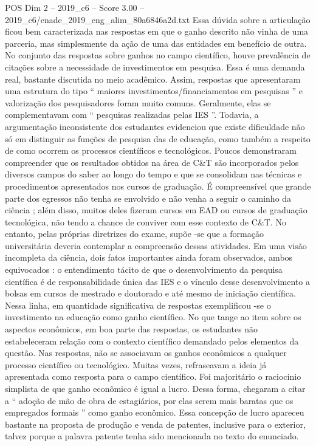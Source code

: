 \begin{textsample}{POS Dim 2 – 2019\_c6 – Score 3.00 – 2019\_c6/enade\_2019\_eng\_alim\_80a6846a2d.txt}
Essa dúvida sobre a articulação ficou bem caracterizada nas respostas em que o ganho descrito não vinha de uma parceria, mas simplesmente da ação de uma das entidades em benefício de outra.
No conjunto das respostas sobre ganhos no campo científico, houve prevalência de citações sobre a necessidade de investimentos em pesquisa.
Essa é uma demanda real, bastante discutida no meio acadêmico.
Assim, respostas que apresentaram uma estrutura do tipo “ maiores investimentos/financiamentos em pesquisas ” e valorização dos pesquisadores foram muito comuns.
Geralmente, elas se complementavam com “ pesquisas realizadas pelas IES ”.
Todavia, a argumentação inconsistente dos estudantes evidenciou que existe dificuldade não só em distinguir as funções de pesquisa das de educação, como também a respeito de como ocorrem os processos científicos e tecnológicos.
Poucos demonstraram compreender que os resultados obtidos na área de C\&T são incorporados pelos diversos campos do saber ao longo do tempo e que se consolidam nas técnicas e procedimentos apresentados nos cursos de graduação.
É compreensível que grande parte dos egressos não tenha se envolvido e não venha a seguir o caminho da ciência ; além disso, muitos deles fizeram cursos em EAD ou cursos de graduação tecnológica, não tendo a chance de conviver com esse contexto de C\&T.
No entanto, pelas próprias diretrizes do exame, supõe -se que a formação universitária deveria contemplar a compreensão dessas atividades.
Em uma visão incompleta da ciência, dois fatos importantes ainda foram observados, ambos equivocados : o entendimento tácito de que o desenvolvimento da pesquisa científica é de responsabilidade única das IES e o vínculo desse desenvolvimento a bolsas em cursos de mestrado e doutorado e até mesmo de iniciação científica.
Nessa linha, em quantidade significativa de respostas exemplificou -se o investimento na educação como ganho científico.
No que tange ao item sobre os aspectos econômicos, em boa parte das respostas, os estudantes não estabeleceram relação com o contexto científico demandado pelos elementos da questão.
Nas respostas, não se associavam os ganhos econômicos a qualquer processo científico ou tecnológico.
Muitas vezes, refraseavam a ideia já apresentada como resposta para o campo científico.
Foi majoritário o raciocínio simplista de que ganho econômico é igual a lucro.
Dessa forma, chegaram a citar a “ adoção de mão de obra de estagiários, por elas serem mais baratas que os empregados formais ” como ganho econômico.
Essa concepção de lucro apareceu bastante na proposta de produção e venda de patentes, inclusive para o exterior, talvez porque a palavra patente tenha sido mencionada no texto do enunciado.

\end{textsample}
